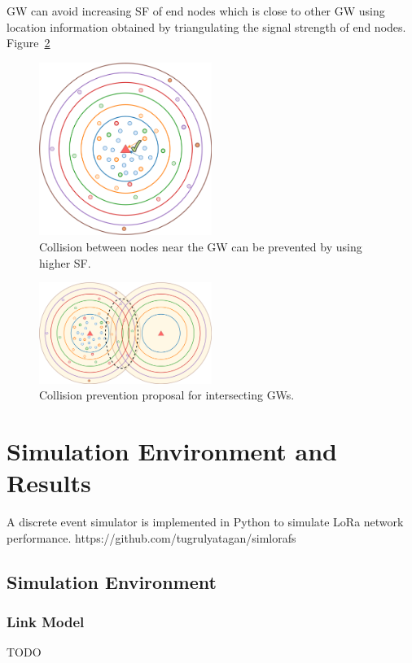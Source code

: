 \documentclass[conference]{IEEEtran}
\begin{document}
\par GW can avoid increasing SF of end nodes which is close to other GW using location information obtained by triangulating the signal strength of end nodes. Figure~\ref{fig:proposal_multi_gw}

\begin{figure}
\centering
\includegraphics[width=0.5\textwidth]{lora2}
\caption{Collision between nodes near the GW can be prevented by using higher SF.}
\label{fig:proposal_single_gw}
\end{figure}

\begin{figure}
\centering
\includegraphics[width=0.5\textwidth]{lora3}
\caption{Collision prevention proposal for intersecting GWs.}
\label{fig:proposal_multi_gw}
\end{figure}


\section{Simulation Environment and Results}
A discrete event simulator is implemented in Python to simulate LoRa network performance. 
https://github.com/tugrulyatagan/simlorafs

\subsection{Simulation Environment}

\subsubsection{Link Model}
TODO
\end{document}
